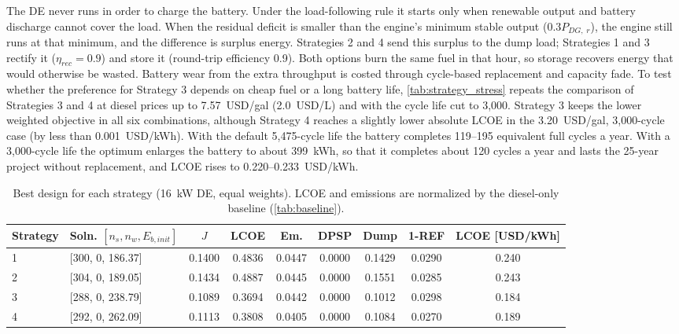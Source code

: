 \documentclass[final,3p,times]{elsarticle}
\begin{document}
The DE never runs in order to charge the battery. Under the load-following rule it starts only when renewable output and battery discharge cannot cover the load. When the residual deficit is smaller than the engine's minimum stable output ($0.3P_{DG,\;r}$), the engine still runs at that minimum, and the difference is surplus energy. Strategies 2 and 4 send this surplus to the dump load; Strategies 1 and 3 rectify it ($\eta_{rec} = 0.9$) and store it (round-trip efficiency 0.9). Both options burn the same fuel in that hour, so storage recovers energy that would otherwise be wasted. Battery wear from the extra throughput is costed through cycle-based replacement and capacity fade. To test whether the preference for Strategy 3 depends on cheap fuel or a long battery life, \cref{tab:strategy_stress} repeats the comparison of Strategies 3 and 4 at diesel prices up to 7.57~USD/gal (2.0~USD/L) and with the cycle life cut to 3,000. Strategy 3 keeps the lower weighted objective in all six combinations, although Strategy 4 reaches a slightly lower absolute LCOE in the 3.20~USD/gal, 3,000-cycle case (by less than 0.001~USD/kWh). With the default 5,475-cycle life the battery completes 119--195 equivalent full cycles a year. With a 3,000-cycle life the optimum enlarges the battery to about 399~kWh, so that it completes about 120 cycles a year and lasts the 25-year project without replacement, and LCOE rises to 0.220--0.233~USD/kWh.

\begin{table}[htbp]
\centering
\small
\begin{tabular}{l l c c c c c c c}
\toprule
\textbf{Strategy} & \textbf{Soln. $[n_s, n_w, E_{b,init}]$} & \textbf{$J$} & \textbf{LCOE} & \textbf{Em.} & \textbf{DPSP} & \textbf{Dump} & \textbf{1-REF} & \textbf{LCOE [USD/kWh]} \\
\midrule
1 & [300, 0, 186.37] & 0.1400 & 0.4836 & 0.0447 & 0.0000 & 0.1429 & 0.0290 & 0.240 \\
2 & [304, 0, 189.05] & 0.1434 & 0.4887 & 0.0445 & 0.0000 & 0.1551 & 0.0285 & 0.243 \\
3 & [288, 0, 238.79] & 0.1089 & 0.3694 & 0.0442 & 0.0000 & 0.1012 & 0.0298 & 0.184 \\
4 & [292, 0, 262.09] & 0.1113 & 0.3808 & 0.0405 & 0.0000 & 0.1084 & 0.0270 & 0.189 \\
\bottomrule
\end{tabular}
\caption{\label{tab:strat} Best design for each strategy (16~kW DE, equal weights). LCOE and emissions are normalized by the diesel-only baseline (\cref{tab:baseline}).}
\end{table}
\end{document}
